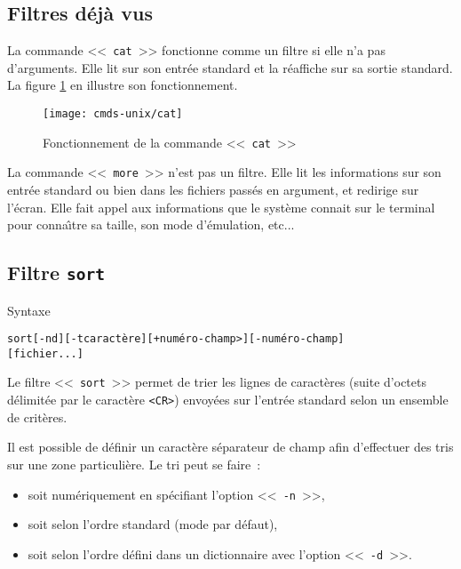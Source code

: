 \subsection{Filtres d{\'e}j{\`a} vus}

La commande <<~{\tt  cat}~>> fonctionne comme un filtre si elle n'a pas
d'arguments. Elle lit sur son entr{\'e}e standard et la r{\'e}affiche sur sa
sortie standard. La figure \ref{fig-cmds-cat} en illustre son fonctionnement.

\begin{figure}[hbtp]
\centering
\texttt{[image: cmds-unix/cat]}
\caption{\label{fig-cmds-cat}Fonctionnement de la commande <<~{\tt cat}~>>}
\end{figure}

\begin{remarque}
La commande <<~{\tt more}~>> n'est pas un filtre. Elle lit les
informations sur son entr{\'e}e standard ou bien dans les fichiers pass{\'e}s en
argument, et redirige sur l'{\'e}cran. Elle fait appel aux informations que
le syst{\`e}me connait sur le terminal pour conna{\^\i}tre sa taille, son mode
d'{\'e}mulation, etc{...}
\end{remarque}

\subsection{Filtre {\tt sort}}

\begin{definition}{Syntaxe}
\begin{alltt}
sort [-nd] [-tcaract{\`e}re] [+num{\'e}ro-champ>] [-num{\'e}ro-champ]
            [fichier...]
\end{alltt}
\end{definition}

Le filtre <<~{\tt sort}~>> permet de trier les lignes de caract{\`e}res (suite
d'octets d{\'e}limit{\'e}e par le caract{\`e}re \verb=<CR>=) envoy{\'e}es sur l'entr{\'e}e standard
selon un ensemble de crit{\`e}res.

Il est possible de d{\'e}finir un caract{\`e}re s{\'e}parateur de champ afin
d'effectuer des tris sur une zone particuli{\`e}re. Le tri peut se faire~:
\begin{itemize}
	\item soit num{\'e}riquement en sp{\'e}cifiant l'option <<~{\tt -n}~>>,
	\item soit selon l'ordre {\ASCII} standard (mode par d{\'e}faut),
	\item soit selon l'ordre d{\'e}fini dans un dictionnaire avec l'option
		  <<~{\tt -d}~>>.
\end{itemize}

